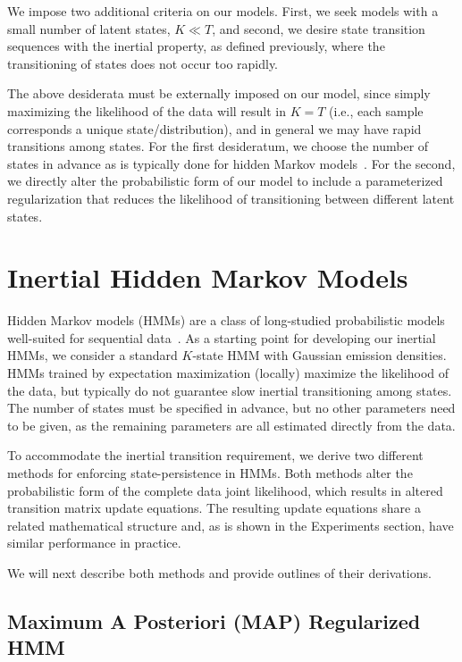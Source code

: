 \documentclass[letterpaper]{article}
\begin{document}
We impose two additional criteria on our models. First, we seek models
with a small number of latent states, $K \ll T$, and second, we desire state
transition sequences with the inertial property, as defined previously, where 
the transitioning of states does not occur too rapidly. 

The above desiderata must be externally imposed on our model, since simply
maximizing the likelihood of the data will result in $K = T$ (i.e., each sample
corresponds a unique state/distribution), and in general we may have rapid
transitions among states. For the first desideratum,  we choose the number of
states in advance as is typically done for hidden Markov
models~\cite{rabiner1989tutorial}. For the second, we directly alter the
probabilistic form of our model to include a parameterized regularization that
reduces the likelihood of transitioning between different latent states.

\section{Inertial Hidden Markov Models}

Hidden Markov models (HMMs) are a class of long-studied probabilistic models
well-suited for sequential data~\cite{rabiner1989tutorial}. As a starting point
for developing our inertial HMMs, we consider a standard $K$-state HMM with
Gaussian emission densities. HMMs trained by expectation maximization (locally) maximize the likelihood of the data,
but typically do not guarantee slow inertial transitioning among states. The
number of states must be specified in advance, but no other parameters need to
be given, as the remaining parameters are all estimated directly from the
data.

To accommodate the inertial transition requirement, we derive two different
methods for enforcing state-persistence in HMMs. Both methods alter the
probabilistic form of the complete data joint likelihood, which results
in altered transition matrix update equations. The resulting update equations
share a related mathematical structure and, as is shown in
the Experiments section, have similar performance in practice.

We will next describe both methods and provide outlines of their derivations. 

\subsection{Maximum A Posteriori (MAP) Regularized HMM}
\end{document}
